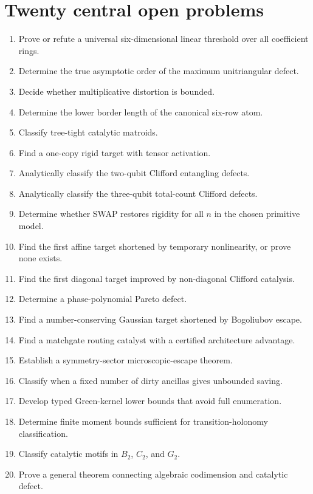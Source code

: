 \section{Twenty central open problems}
\begin{enumerate}
\item Prove or refute a universal six-dimensional linear threshold over all coefficient rings.
\item Determine the true asymptotic order of the maximum unitriangular defect.
\item Decide whether multiplicative distortion is bounded.
\item Determine the lower border length of the canonical six-row atom.
\item Classify tree-tight catalytic matroids.
\item Find a one-copy rigid target with tensor activation.
\item Analytically classify the two-qubit Clifford entangling defects.
\item Analytically classify the three-qubit total-count Clifford defects.
\item Determine whether SWAP restores rigidity for all $n$ in the chosen primitive model.
\item Find the first affine target shortened by temporary nonlinearity, or prove none exists.
\item Find the first diagonal target improved by non-diagonal Clifford catalysis.
\item Determine a phase-polynomial Pareto defect.
\item Find a number-conserving Gaussian target shortened by Bogoliubov escape.
\item Find a matchgate routing catalyst with a certified architecture advantage.
\item Establish a symmetry-sector microscopic-escape theorem.
\item Classify when a fixed number of dirty ancillas gives unbounded saving.
\item Develop typed Green-kernel lower bounds that avoid full enumeration.
\item Determine finite moment bounds sufficient for transition-holonomy classification.
\item Classify catalytic motifs in $B_2$, $C_2$, and $G_2$.
\item Prove a general theorem connecting algebraic codimension and catalytic defect.
\end{enumerate}

